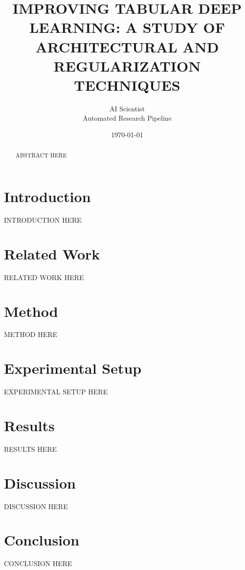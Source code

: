 \documentclass[11pt,a4paper]{article}
\begin{document}
\title{IMPROVING TABULAR DEEP LEARNING: A STUDY OF ARCHITECTURAL AND REGULARIZATION TECHNIQUES}

\author{AI Scientist \\ Automated Research Pipeline}
\date{\today}
\maketitle

\begin{abstract}
ABSTRACT HERE
\end{abstract}

\section{Introduction}
\label{sec:intro}
INTRODUCTION HERE

\section{Related Work}
\label{sec:related}
RELATED WORK HERE

\section{Method}
\label{sec:method}
METHOD HERE

\section{Experimental Setup}
\label{sec:setup}
EXPERIMENTAL SETUP HERE

\section{Results}
\label{sec:results}
RESULTS HERE

\section{Discussion}
\label{sec:discussion}
DISCUSSION HERE

\section{Conclusion}
\label{sec:conclusion}
CONCLUSION HERE

\nocite{*}


\end{document}

